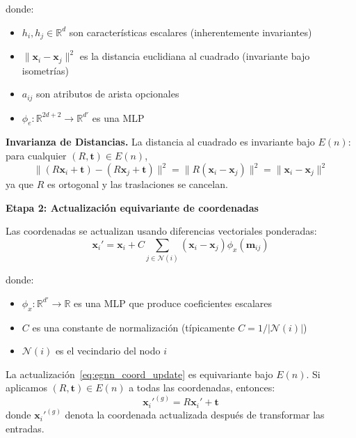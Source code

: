 donde:
\begin{itemize}
    \item $h_i, h_j \in \mathbb{R}^d$ son características escalares (inherentemente invariantes)
    \item $\|\mathbf{x}_i - \mathbf{x}_j\|^2$ es la distancia euclidiana al cuadrado (invariante bajo isometrías)
    \item $a_{ij}$ son atributos de arista opcionales
    \item $\phi_e: \mathbb{R}^{2d+2} \to \mathbb{R}^{d'}$ es una MLP
\end{itemize}

\textbf{Invarianza de Distancias.} La distancia al cuadrado es invariante bajo $E(n)$: para cualquier $(R, \mathbf{t}) \in E(n)$,
\begin{equation}
\|(R\mathbf{x}_i + \mathbf{t}) - (R\mathbf{x}_j + \mathbf{t})\|^2 = \|R(\mathbf{x}_i - \mathbf{x}_j)\|^2 = \|\mathbf{x}_i - \mathbf{x}_j\|^2
\end{equation}
ya que $R$ es ortogonal y las traslaciones se cancelan.

\textbf{Etapa 2: Actualización equivariante de coordenadas}

Las coordenadas se actualizan usando diferencias vectoriales ponderadas:
\begin{equation}\label{eq:egnn_coord_update}
\mathbf{x}_i' = \mathbf{x}_i + C \sum_{j \in \mathcal{N}(i)} (\mathbf{x}_i - \mathbf{x}_j) \phi_x(\mathbf{m}_{ij})
\end{equation}

donde:
\begin{itemize}
    \item $\phi_x: \mathbb{R}^{d'} \to \mathbb{R}$ es una MLP que produce coeficientes escalares
    \item $C$ es una constante de normalización (típicamente $C = 1/|\mathcal{N}(i)|$)
    \item $\mathcal{N}(i)$ es el vecindario del nodo $i$
\end{itemize}

\begin{proposition}\label{prop:egnn_coord_equivariance}
La actualización~\eqref{eq:egnn_coord_update} es equivariante bajo $E(n)$. Si aplicamos $(R, \mathbf{t}) \in E(n)$ a todas las coordenadas, entonces:
\begin{equation}
\mathbf{x}_i'^{(g)} = R\mathbf{x}_i' + \mathbf{t}
\end{equation}
donde $\mathbf{x}_i'^{(g)}$ denota la coordenada actualizada después de transformar las entradas.
\end{proposition}

